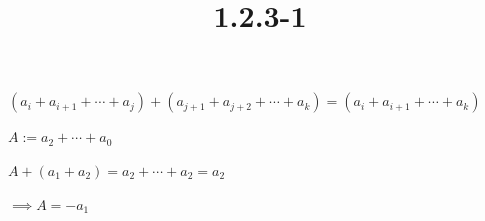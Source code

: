 \documentclass{article}
\title{1.2.3-1}
\begin{document}
\maketitle

\( (a_i + a_{i+1} + \cdots + a_j) + (a_{j+1} + a_{j+2} + \cdots + a_k) = (a_i + a_{i+1} + \cdots + a_k) \)

\( A := a_2 + \cdots + a_0 \)

\( A + (a_1 + a_2) = a_2 + \cdots + a_2 = a_2 \)

\( \implies A = -a_1 \)
\end{document}
